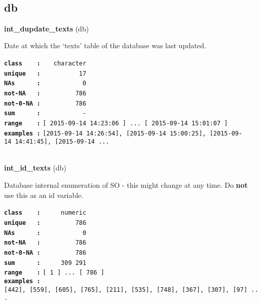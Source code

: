 \documentclass[]{article}
\begin{document}
~

\subsection{db}\label{db}

\textbf{int\_dupdate\_texts} (db)

Date at which the `texts' table of the database was last updated.

\textbf{\texttt{class\ \ \ \ :}} \texttt{~~~character}\\
\textbf{\texttt{unique\ \ \ :}} \texttt{~~~~~~~~~~17}\\
\textbf{\texttt{NAs\ \ \ \ \ \ :}} \texttt{~~~~~~~~~~~0}\\
\textbf{\texttt{not-NA\ \ \ :}} \texttt{~~~~~~~~~786}\\
\textbf{\texttt{not-0-NA\ :}} \texttt{~~~~~~~~~786}\\
\textbf{\texttt{sum\ \ \ \ \ \ :}} \texttt{~~~~~~~~~~~-}\\
\textbf{\texttt{range\ \ \ \ :}}
\texttt{{[}\ 2015-09-14\ 14:23:06\ {]}\ ...\ {[}\ 2015-09-14\ 15:01:07\ {]}}\\
\textbf{\texttt{examples\ :}}
\texttt{{[}2015-09-14\ 14:26:54{]},\ {[}2015-09-14\ 15:00:25{]},\ {[}2015-09-14\ 14:41:45{]},\ {[}2015-09-14\ ...}\\

~

\textbf{int\_id\_texts} (db)

Database internal enumeration of SO - this might change at any time. Do
\textbf{not} use this as an id variable.

\textbf{\texttt{class\ \ \ \ :}} \texttt{~~~~~numeric}\\
\textbf{\texttt{unique\ \ \ :}} \texttt{~~~~~~~~~786}\\
\textbf{\texttt{NAs\ \ \ \ \ \ :}} \texttt{~~~~~~~~~~~0}\\
\textbf{\texttt{not-NA\ \ \ :}} \texttt{~~~~~~~~~786}\\
\textbf{\texttt{not-0-NA\ :}} \texttt{~~~~~~~~~786}\\
\textbf{\texttt{sum\ \ \ \ \ \ :}} \texttt{~~~~~309~291}\\
\textbf{\texttt{range\ \ \ \ :}}
\texttt{{[}\ 1\ {]}\ ...\ {[}\ 786\ {]}}\\
\textbf{\texttt{examples\ :}}
\texttt{{[}442{]},\ {[}559{]},\ {[}605{]},\ {[}765{]},\ {[}211{]},\ {[}535{]},\ {[}748{]},\ {[}367{]},\ {[}307{]},\ {[}97{]}\ ...}\\
\end{document}
